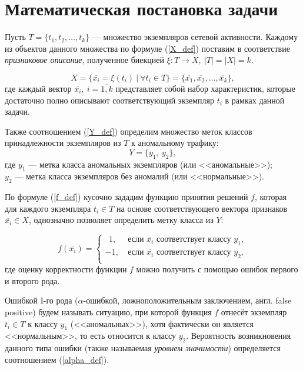 \section{Математическая постановка задачи}

Пусть $T = \{t_1, t_2, \ldots , t_k\}$ --- множество экземпляров сетевой активности. Каждому из объектов данного множества по формуле (\ref{X_def}) поставим в соответствие \textit{признаковое описание}, полученное биекцией $\xi: T \rightarrow X, \ |T| = |X| = k$.

\begin{equation}\label{X_def}
    X = \{\overline{x_i} = \xi(t_i)\ |\ \forall t_i \in T\} = \{\overline{x_1}, \overline{x_2}, \ldots , \overline{x_k}\},
\end{equation}
где каждый вектор $\overline{x_i},\ i = \overline{1,k}$ представляет собой набор характеристик, которые достаточно полно описывают соответствующий экземпляр $t_i$ в рамках данной задачи.

Также соотношением (\ref{Y_def}) определим множество меток классов принадлежности экземпляров из $T$ к аномальному трафику:
\begin{equation}\label{Y_def}
    Y = \{y_1,\ y_2\},
\end{equation}
где    $y_1$ --- метка класса аномальных экземпляров (или <<аномальные>>); \\
$y_2$ --- метка класса экземпляров без аномалий (или <<нормальные>>).

По формуле (\ref{f_def}) кусочно зададим функцию принятия решений $f$, которая для каждого экземпляра $t_i \in T$ на основе соответствующего вектора признаков $\overline{x_i} \in X$, однозначно позволяет определить метку класса из $Y$:

\begin{equation}\label{f_def}
    f(\overline{x_i}) = \begin{cases}
            \ \ 1, &\ \text{если } \overline{x_i} \text{ соответствует классу }y_1, \\
               -1, &\ \text{если } \overline{x_i} \text{ соответствует классу }y_2, \\ 
         \end{cases}
\end{equation}
где оценку корректности функции $f$ можно получить с помощью ошибок первого и второго рода.

Ошибкой I-го рода ($\alpha$-ошибкой, ложноположительным заключением, англ. false positive) будем называть ситуацию, при которой функция $f$ отнесёт экземпляр $t_i \in T$ к классу $y_1$ (<<аномальных>>), хотя фактически он является <<нормальным>>, то есть относится к классу $y_2$. Вероятность возникновения данного типа ошибки (также называемая \textit{уровнем значимости}) определяется соотношением (\ref{alpha_def}).

